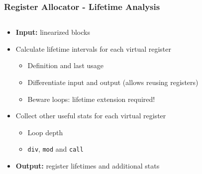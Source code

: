 \documentclass[navbaroff,en]{sdqbeamer}
\begin{document}
\begin{frame}
\frametitle{Register Allocator - Lifetime Analysis}

\begin{columns}
	\begin{column}{0.65\textwidth}
		\begin{itemize}
			\item \textbf{Input:} linearized blocks
			\item Calculate lifetime intervals for each virtual register 
			\begin{itemize}
				\item Definition and last usage
				\item Differentiate input and output (allows reusing registers)
				\item Beware loops: lifetime extension required!
			\end{itemize}
			\item Collect other useful stats for each virtual register
			\begin{itemize}
				\item Loop depth
				\item \texttt{div}, \texttt{mod} and \texttt{call}
			\end{itemize}
			\item \textbf{Output:} register lifetimes and additional stats
		\end{itemize}
	\end{column}
	

\end{columns}
\end{frame}
\end{document}
